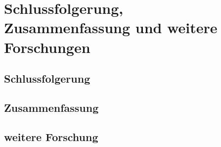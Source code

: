 \documentclass[Bachelorarbeit.tex]{subfiles}
\begin{document}
\chapter{Schlussfolgerung, Zusammenfassung und weitere Forschungen}

\section{Schlussfolgerung}

\section{Zusammenfassung}

\section{weitere Forschung}
\end{document}
